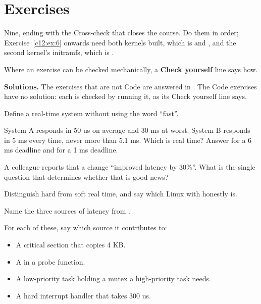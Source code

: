 
\section{Exercises}
\label{c12:sec:exercises}\label{c12:app:c}

\begin{aside}
Nine, ending with the Cross-check that closes the course. Do them in order; Exercise~\ref{c12:ex:6}
onwards need both kernels built, which is  and , and the
second kernel's initramfs, which is .

Where an exercise can be checked mechanically, a \textbf{Check yourself} line says how.

\textbf{Solutions.} The exercises that are not Code are answered in . The Code
exercises have no solution: each is checked by running it, as its Check yourself line says.
\end{aside}

\label{c12:ex:1}

 Define a real-time system without using the word ``fast''.

 System A responds in 50 us on average and 30 ms at worst. System B responds in 5 ms every
time, never more than 5.1 ms. Which is real time? Answer for a 6 ms deadline and for a 1 ms
deadline.

 A colleague reports that a change ``improved latency by 30\%''. What is the single
question that determines whether that is good news?

 Distinguish hard from soft real time, and say which Linux with  honestly
is.

\label{c12:ex:2}

 Name the three sources of latency from .

 For each of these, say which source it contributes to:
\begin{itemize}
  \item A  critical section that copies 4 KB.
  \item A  in a probe function.
  \item A low-priority task holding a mutex a high-priority task needs.
  \item A hard interrupt handler that takes 300 us.
\end{itemize}

